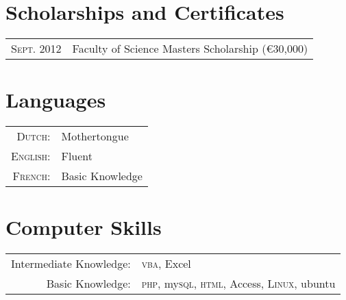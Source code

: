\documentclass[a4paper,10pt]{article} %
\begin{document}

\section{Scholarships and Certificates}

\begin{tabular}{rl}
\textsc{Sept.} 2012 & Faculty of Science Masters Scholarship \footnotesize(€30,000)\normalsize\\

\end{tabular}


\section{Languages}

\begin{tabular}{rl}
\textsc{Dutch:} & Mothertongue\\

\textsc{English:} & Fluent\\  %

\textsc{French:} & Basic Knowledge\\
\end{tabular}


\section{Computer Skills} %

\begin{tabular}{rl} 
Intermediate Knowledge: & \textsc{vba}, Excel\\

Basic Knowledge: & \textsc{php}, my\textsc{sql}, \textsc{html}, Access, \textsc{Linux}, ubuntu\\
\end{tabular}
\end{document}
